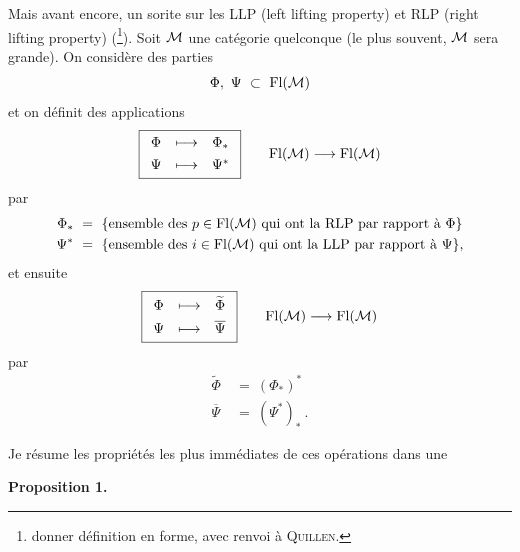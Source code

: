 Mais avant encore, un sorite sur les LLP (left lifting property) et RLP (right lifting property) (\footnote[1]{donner définition en forme, avec renvoi à \textsc{Quillen}.}). Soit $\mathcal{M}$ une catégorie quelconque (le plus souvent, $\mathcal{M}$ sera grande). On considère des parties
\[
\Phi,\ \Psi\ \subset\ \Fl(\M)
\]
et on définit des applications
\[
\boxed{\begin{array}{ccc}
\Phi & \longmapsto & \Phi_* \\[1ex]
\Psi & \longmapsto & \Psi^*
\end{array}}
\qquad
\mathrm{Fl}(\mathcal{M}) \longrightarrow \mathrm{Fl}(\mathcal{M})
\]
 par %
\[
\begin{aligned}
\Phi_* \ &= \ \{\text{ensemble des } p \in \mathrm{Fl}(\mathcal{M}) \text{ qui ont la RLP par rapport à } \Phi\} \\
\Psi^* \ &= \ \{\text{ensemble des } i \in \mathrm{Fl}(\mathcal{M}) \text{ qui ont la LLP par rapport à } \Psi\},
\end{aligned}
\]
et ensuite
\[
\boxed{\begin{array}{ccc}
\Phi & \longmapsto & \widetilde{\Phi} \\[1ex]
\Psi & \longmapsto & \overline{\Psi}
\end{array}}
\qquad
\mathrm{Fl}(\mathcal{M}) \longrightarrow \mathrm{Fl}(\mathcal{M})
\]
 par %
\[
\begin{aligned}
\widetilde{\Phi} \ &= \ (\Phi_*)^* \\
\overline{\Psi} \ &= \ (\Psi^*)_* \ .
\end{aligned}
\]


Je résume les propriétés les plus immédiates de ces opérations dans une

\noindent\textbf{Proposition 1.}

